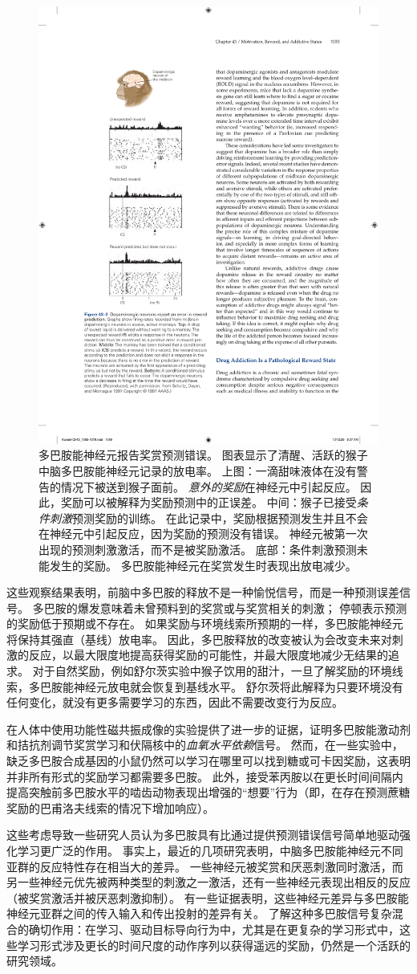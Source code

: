 \begin{figure}[htbp]
	\centering
	\includegraphics[width=0.45\linewidth]{chap43/fig_43_2}
	\caption{多巴胺能神经元报告奖赏预测错误。
		图表显示了清醒、活跃的猴子中脑多巴胺能神经元记录的放电率。
		上图：一滴甜味液体在没有警告的情况下被送到猴子面前。
		\textit{意外的奖励}在神经元中引起反应。
		因此，奖励可以被解释为奖励预测中的正误差。
		中间：猴子已接受\textit{条件刺激}预测奖励的训练。
		在此记录中，奖励根据预测发生并且不会在神经元中引起反应，因为奖励的预测没有错误。
		神经元被第一次出现的预测刺激激活，而不是被奖励激活。
		底部：条件刺激预测未能发生的奖励。
		多巴胺能神经元在奖赏发生时表现出放电减少\cite{schultz1997neural}。}
	\label{fig:43_2}
\end{figure}


这些观察结果表明，前脑中多巴胺的释放不是一种愉悦信号，而是一种预测误差信号。
多巴胺的爆发意味着未曾预料到的奖赏或与奖赏相关的刺激；
停顿表示预测的奖励低于预期或不存在。
如果奖励与环境线索所预期的一样，多巴胺能神经元将保持其强直（基线）放电率。
因此，多巴胺释放的改变被认为会改变未来对刺激的反应，以最大限度地提高获得奖励的可能性，并最大限度地减少无结果的追求。
对于自然奖励，例如舒尔茨实验中猴子饮用的甜汁，一旦了解奖励的环境线索，多巴胺能神经元放电就会恢复到基线水平。
舒尔茨将此解释为只要环境没有任何变化，就没有更多需要学习的东西，因此不需要改变行为反应。


在人体中使用功能性磁共振成像的实验提供了进一步的证据，证明多巴胺能激动剂和拮抗剂调节奖赏学习和伏隔核中的\textit{血氧水平依赖}信号。
然而，在一些实验中，缺乏多巴胺合成基因的小鼠仍然可以学习在哪里可以找到糖或可卡因奖励，这表明并非所有形式的奖励学习都需要多巴胺。
此外，接受苯丙胺以在更长时间间隔内提高突触前多巴胺水平的啮齿动物表现出增强的“想要”行为（即，在存在预测蔗糖奖励的巴甫洛夫线索的情况下增加响应）。


这些考虑导致一些研究人员认为多巴胺具有比通过提供预测错误信号简单地驱动强化学习更广泛的作用。
事实上，最近的几项研究表明，中脑多巴胺能神经元不同亚群的反应特性存在相当大的差异。
一些神经元被奖赏和厌恶刺激同时激活，而另一些神经元优先被两种类型的刺激之一激活，还有一些神经元表现出相反的反应（被奖赏激活并被厌恶刺激抑制）。
有一些证据表明，这些神经元差异与多巴胺能神经元亚群之间的传入输入和传出投射的差异有关。
了解这种多巴胺信号复杂混合的确切作用：在学习、驱动目标导向行为中，尤其是在更复杂的学习形式中，这些学习形式涉及更长的时间尺度的动作序列以获得遥远的奖励，仍然是一个活跃的研究领域。


